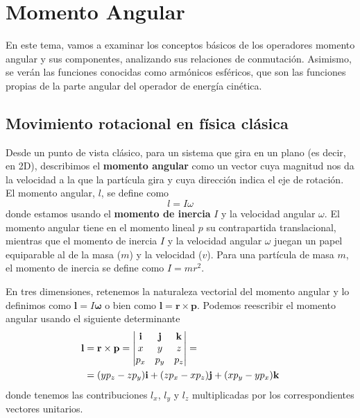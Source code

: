 \chapter{Momento Angular}
En este tema, vamos a examinar los conceptos básicos de los
operadores momento angular y sus componentes, analizando sus
relaciones de conmutación. Asimismo, se verán las funciones
conocidas como armónicos esféricos, que son las funciones
propias de la parte angular del operador de energía cinética.

\section{Movimiento rotacional en física clásica}
Desde un punto de vista clásico, para un sistema que gira 
en un plano (es decir, en 2D), describimos el \textbf{momento
angular} como un vector cuya magnitud nos da la velocidad 
a la que la partícula gira y cuya dirección indica el eje
de rotación. El momento angular, $l$, se define como
\begin{equation}
    l=I\omega
\end{equation}
donde estamos usando el \textbf{momento de inercia} $I$ y
la velocidad angular $\omega$. El momento angular tiene 
en el momento lineal $p$ su contrapartida translacional, mientras que el momento de inercia $I$ y la velocidad
angular $\omega$ juegan un papel equiparable al de la masa
($m$) y la velocidad ($v$). Para una partícula de masa $m$, 
el momento de inercia se define como $I=mr^2$.


En tres dimensiones, retenemos la naturaleza vectorial
del momento angular y lo definimos como 
$\mathbf{l}= I\bm{\omega}$
o bien como $\mathbf{l} = \mathbf{r}\times\mathbf{p}$.
Podemos reescribir el momento angular usando el siguiente
determinante
\begin{align}
    \mathbf{l}&=\mathbf{r}\times\mathbf{p} =
    \begin{vmatrix}
\mathbf{i} & \mathbf{j} & \mathbf{k}  \\ 
x & y & z \\ 
p_x & p_y & p_z  \notag
\end{vmatrix} = \\
&= (yp_z-zp_y)\mathbf{i} +
(zp_x-xp_z)\mathbf{j} +
(xp_y-yp_x)\mathbf{k}
\end{align}
donde tenemos las contribuciones $l_x$, $l_y$ y $l_z$
multiplicadas por los correspondientes vectores unitarios.

